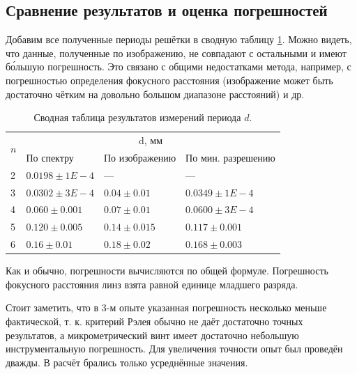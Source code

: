 \documentclass[a4paper]{article}
\begin{document}
\subsection{Сравнение результатов и оценка погрешностей}

Добавим все полученные периоды решётки в сводную таблицу \ref{tab:Сводная}. Можно видеть, что данные, полученные по изображению, не совпадают с остальными и имеют б\'{о}льшую погрешность. Это связано с общими недостатками метода, например, с погрешностью определения фокусного расстояния (изображение может быть достаточно чётким на довольно большом диапазоне расстояний) и др.

\begin{table}[h]
	\centering
	\begin{tabular}{|l|l|l|l|}
		\hline
		\multicolumn{1}{|c|}{\multirow{2}{*}{$n$}} & \multicolumn{3}{c|}{d, мм}                              \\ \cline{2-4} 
		\multicolumn{1}{|c|}{}                     & По спектру       & По изображению  & По мин. разрешению \\ \hline
		2                                          & $0.0198\pm 1E-4$ & ---             & ---                \\ \hline
		3                                          & $0.0302\pm 3E-4$ & $0.04\pm 0.01$  & $0.0349\pm 1E-4$   \\ \hline
		4                                          & $0.060\pm 0.001$ & $0.07\pm 0.01$  & $0.0600\pm 3E-4$   \\ \hline
		5                                          & $0.120\pm 0.005$ & $0.14\pm 0.015$ & $0.117\pm 0.001$   \\ \hline
		6                                          & $0.16\pm 0.01$   & $0.18\pm 0.02$  & $0.168\pm 0.003$   \\ \hline
	\end{tabular}
	\caption{Сводная таблица результатов измерений периода $d$.}
	\label{tab:Сводная}
\end{table}

Как и обычно, погрешности вычисляются по общей формуле. Погрешность фокусного расстояния линз взята равной единице младшего разряда. 

Стоит заметить, что в 3-м опыте указанная погрешность несколько меньше фактической, т. к. критерий Рэлея обычно не даёт достаточно точных результатов, а микрометрический винт имеет достаточно небольшую инструментальную погрешность. Для увеличения точности опыт был проведён дважды. В расчёт брались только усреднённые значения.
\end{document}
